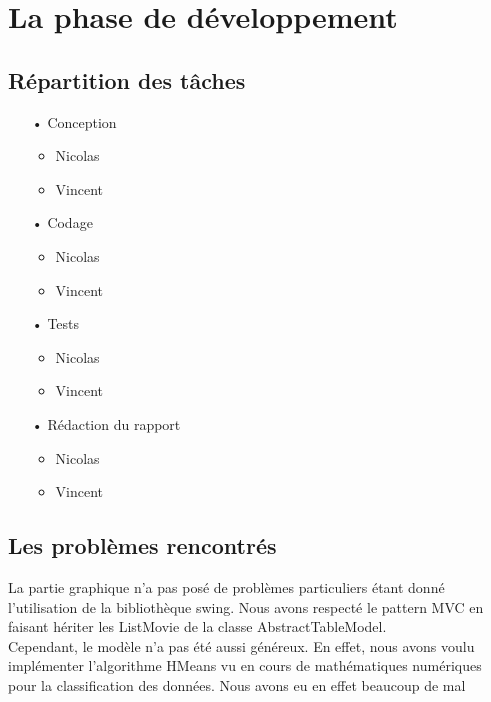 \section{La phase de développement}

\subsection{Répartition des tâches}

\begin{itemize}
\item[•]{Conception}

	\begin{itemize}
		\item{Nicolas}
		\item{Vincent}
	\end{itemize}

\item[•]{Codage}

	\begin{itemize}
		\item{Nicolas}
		\item{Vincent}
	\end{itemize}

\item[•]{Tests}

	\begin{itemize}
		\item{Nicolas}
		\item{Vincent}
	\end{itemize}

\item[•]{Rédaction du rapport}
	\begin{itemize}
		\item{Nicolas}
		\item{Vincent}
	\end{itemize}

\end{itemize}

\subsection{Les problèmes rencontrés}

La partie graphique n'a pas posé de problèmes particuliers étant donné l'utilisation de la bibliothèque swing. Nous avons respecté le pattern MVC en faisant hériter les ListMovie de la classe AbstractTableModel. \\
Cependant, le modèle n'a pas été aussi généreux. En effet, nous avons voulu implémenter l'algorithme HMeans vu en cours de mathématiques numériques pour la classification des données. Nous avons eu en effet beaucoup de mal 
